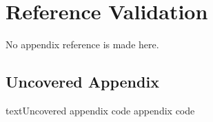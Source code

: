 \documentclass[a4paper,12pt]{report}
\begin{document}
\chapter{Reference Validation}
No appendix reference is made here.
\appendixChapter
\section{Uncovered Appendix}\label{appendix:uncovered}
\begin{code}{text}{Uncovered appendix code}
appendix code
\end{code}
\end{document}
